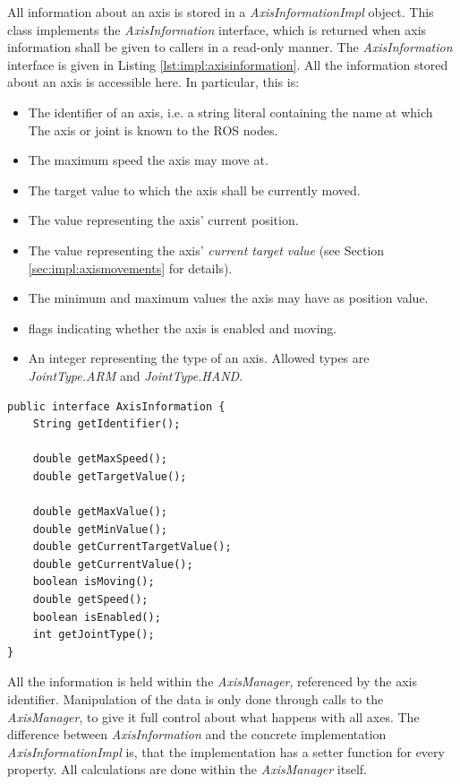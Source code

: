 All information about an axis is stored in a \textit{AxisInformationImpl} object. This class implements the \textit{AxisInformation} interface, which is returned when axis information shall be given to callers in a read-only manner. The \textit{AxisInformation} interface is given in Listing \ref{lst:impl:axisinformation}. All the information stored about an axis is accessible here. In particular, this is: 
\begin{itemize}
	\item The identifier of an axis, i.e. a string literal containing the name at which The axis or joint is known to the ROS nodes.
	\item The maximum speed the axis may move at.
	\item The target value to which the axis shall be currently moved.
	\item The value representing the axis' current position.
	\item The value representing the axis' \textit{current target value} (see Section \ref{sec:impl:axismovements} for details).
	\item The minimum and maximum values the axis may have as position value.
	\item flags indicating whether the axis is enabled and moving.
	\item An integer representing the type of an axis. Allowed types are \textit{JointType.ARM} and \textit{JointType.HAND}.
\end{itemize}

\begin{lstlisting}[caption={The AxisInformation interface}, label=lst:impl:axisinformation]
public interface AxisInformation {
	String getIdentifier();
	
	double getMaxSpeed();
	double getTargetValue();
	
	double getMaxValue();
	double getMinValue();
	double getCurrentTargetValue();
	double getCurrentValue();
	boolean isMoving();
	double getSpeed();
	boolean isEnabled();
	int getJointType();
}
\end{lstlisting}

All the information is held within the \textit{AxisManager}, referenced by the axis identifier. Manipulation of the data is only done through calls to the \textit{AxisManager}, to give it full control about what happens with all axes. The difference between \textit{AxisInformation} and the concrete implementation \textit{AxisInformationImpl} is, that the implementation has a setter function for every property. All calculations are done within the \textit{AxisManager} itself.

